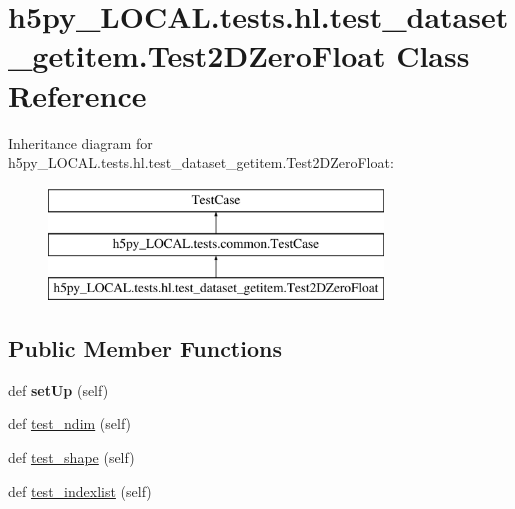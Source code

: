 \hypertarget{classh5py__LOCAL_1_1tests_1_1hl_1_1test__dataset__getitem_1_1Test2DZeroFloat}{}\section{h5py\+\_\+\+L\+O\+C\+A\+L.\+tests.\+hl.\+test\+\_\+dataset\+\_\+getitem.\+Test2\+D\+Zero\+Float Class Reference}
\label{classh5py__LOCAL_1_1tests_1_1hl_1_1test__dataset__getitem_1_1Test2DZeroFloat}
Inheritance diagram for h5py\+\_\+\+L\+O\+C\+A\+L.\+tests.\+hl.\+test\+\_\+dataset\+\_\+getitem.\+Test2\+D\+Zero\+Float\+:\begin{figure}[H]
\begin{center}
\leavevmode
\includegraphics[height=3.000000cm]{classh5py__LOCAL_1_1tests_1_1hl_1_1test__dataset__getitem_1_1Test2DZeroFloat}
\end{center}
\end{figure}
\subsection*{Public Member Functions}
\begin{DoxyCompactItemize}
\item 
\mbox{\label{classh5py__LOCAL_1_1tests_1_1hl_1_1test__dataset__getitem_1_1Test2DZeroFloat_aa05d9d0ed61ef87044a486f7bd5fad0a}} 
def {\bfseries set\+Up} (self)
\item 
def \hyperlink{classh5py__LOCAL_1_1tests_1_1hl_1_1test__dataset__getitem_1_1Test2DZeroFloat_abc85b8bb07af47c6d890a452146176cd}{test\+\_\+ndim} (self)
\item 
def \hyperlink{classh5py__LOCAL_1_1tests_1_1hl_1_1test__dataset__getitem_1_1Test2DZeroFloat_ad40ff405c7531ace501cb2ba922f0d11}{test\+\_\+shape} (self)
\item 
def \hyperlink{classh5py__LOCAL_1_1tests_1_1hl_1_1test__dataset__getitem_1_1Test2DZeroFloat_a889aa0cd466d30260cdc0bc9ada3b5f2}{test\+\_\+indexlist} (self)
\end{DoxyCompactItemize}
